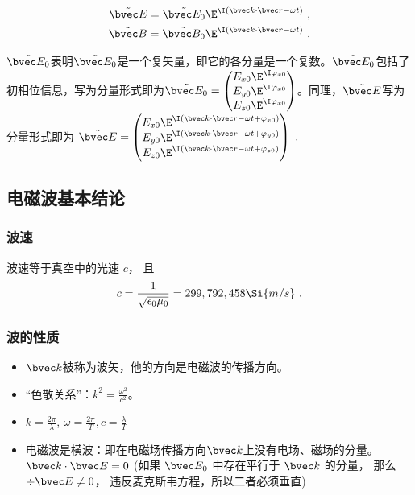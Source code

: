\begin{align}
\tilde {\bvec E} = \tilde {\bvec E_0} \E^{\I(\bvec k \cdot \bvec r - \omega t)}~,\\
\tilde {\bvec B} = \tilde {\bvec B_0} \E^{\I(\bvec k \cdot \bvec r - \omega t)}~.\\
\end{align}

$\tilde {\bvec E_0}$表明$\tilde {\bvec E_0}$是一个复矢量，即它的各分量是一个复数。$\tilde {\bvec E_0}$包括了初相位信息，写为分量形式即为$
\tilde {\bvec E_0} = 
\begin{pmatrix}
E_{x0} \E^{\I\varphi_{x0}}\\
E_{y0} \E^{\I\varphi_{x0}}\\
E_{z0} \E^{\I\varphi_{x0}}\\
\end{pmatrix}
$。同理，$\tilde {\bvec E}$写为分量形式即为 
$\tilde {\bvec E} = 
\begin{pmatrix}
E_{x0} \E^{\I(\bvec k \cdot \bvec r - \omega t + \varphi_{x0})}\\
E_{y0} \E^{\I(\bvec k \cdot \bvec r - \omega t + \varphi_{y0})}\\
E_{z0} \E^{\I(\bvec k \cdot \bvec r - \omega t + \varphi_{z0})}\\
\end{pmatrix}~.
$

\subsection{电磁波基本结论}
\subsubsection{波速}
波速等于真空中的光速 $c$， 且
\begin{equation}\label{eq_VcPlWv_1}
c = \frac{1}{\sqrt{\epsilon_0\mu_0}} = 299,792,458 \Si{m/s}~.
\end{equation}

\subsubsection{波的性质}
\begin{itemize}
\item $\bvec k$被称为波矢，他的方向是电磁波的传播方向。
\item  “色散关系”：$k^2=\frac{\omega^2}{c^2}$。
\item $k=\frac{2\pi}{\lambda}$, $\omega=\frac{2\pi}{T}, c=\frac{\lambda}{T}$
\item 电磁波是横波：即在电磁场传播方向$\bvec k$上没有电场、磁场的分量。$\bvec k \cdot \bvec E = 0$ (如果 $\bvec E_0$ 中存在平行于 $\bvec k$ 的分量， 那么 $\div \bvec E \ne 0$， 违反麦克斯韦方程，所以二者必须垂直)
\end{itemize}

